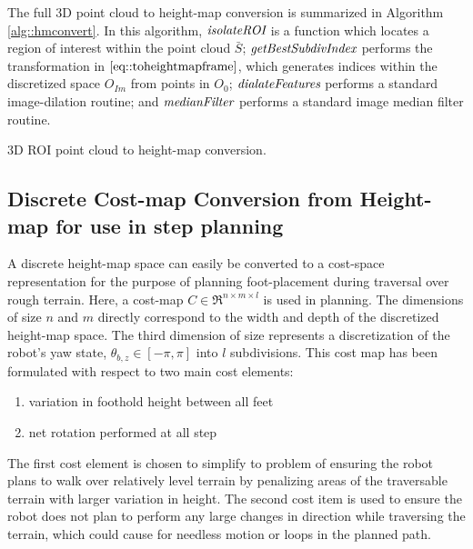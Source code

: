 			The full 3D point cloud to height-map conversion is summarized in Algorithm \ref{alg::hmconvert}. In this algorithm, $\emph{\text{isolateROI}}$ is a function which locates a region of interest within the point cloud $\bar{S}$; $\emph{\text{getBestSubdivIndex}}$ performs the transformation in $\ref{eq::toheightmapframe}$, which generates indices within the discretized space $O_{Im}$ from points in $O_{0}$; $\emph{\text{dialateFeatures}}$ performs a standard image-dilation routine; and $\emph{\text{medianFilter}}$ performs a standard image median filter routine. 
			\begin{algorithm}[!h]
				\begin{algorithmic}
						\EndIf
					\EndFor
				\end{algorithmic}	
				\caption{3D ROI point cloud to height-map conversion.}
				\label{alg::hmconvert}
			\end{algorithm}

		\subsection{Discrete Cost-map Conversion from Height-map for use in step planning}

			A discrete height-map space can easily be converted to a cost-space representation for the purpose of planning foot-placement during traversal over rough terrain. Here, a cost-map $C\in\Re^{n\times m\times l}$ is used in planning. The dimensions of size $n$ and $m$ directly correspond to the width and depth of the discretized height-map space. The third dimension of size represents a discretization of the robot's yaw state, $\theta_{b,z}\in[-\pi,\pi]$ into $l$ subdivisions. This cost map has been formulated with respect to two main cost elements:
				\begin{enumerate}
					\item variation in foothold height between all feet
					\item net rotation performed at all step
				\end{enumerate}
			The first cost element is chosen to simplify to problem of ensuring the robot plans to walk over relatively level terrain by penalizing areas of the traversable terrain with larger variation in height. The second cost item is used to ensure the robot does not plan to perform any large changes in direction while traversing the terrain, which could cause for needless motion or loops in the planned path. 

